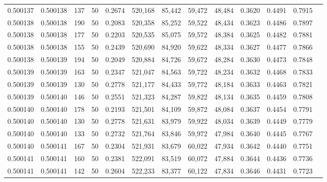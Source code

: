\begin{tabular}{rrrrrrrrrrrrr}
0.500137 & 0.500138 &   137 &  50 &                                     0.2674 & 520,168 &  85,442 &  59,472 &  48,484 & 0.3620 & 0.4491 & 0.7915 \\
0.500138 & 0.500138 &   190 &  50 &                                     0.2083 & 520,358 &  85,252 &  59,522 &  48,434 & 0.3623 & 0.4486 & 0.7897 \\
0.500138 & 0.500138 &   177 &  50 &                                     0.2203 & 520,535 &  85,075 &  59,572 &  48,384 & 0.3625 & 0.4482 & 0.7881 \\
0.500138 & 0.500138 &   155 &  50 &                                     0.2439 & 520,690 &  84,920 &  59,622 &  48,334 & 0.3627 & 0.4477 & 0.7866 \\
0.500138 & 0.500139 &   194 &  50 &                                     0.2049 & 520,884 &  84,726 &  59,672 &  48,284 & 0.3630 & 0.4473 & 0.7848 \\
0.500139 & 0.500139 &   163 &  50 &                                     0.2347 & 521,047 &  84,563 &  59,722 &  48,234 & 0.3632 & 0.4468 & 0.7833 \\
0.500139 & 0.500139 &   130 &  50 &                                     0.2778 & 521,177 &  84,433 &  59,772 &  48,184 & 0.3633 & 0.4463 & 0.7821 \\
0.500139 & 0.500140 &   146 &  50 &                                     0.2551 & 521,323 &  84,287 &  59,822 &  48,134 & 0.3635 & 0.4459 & 0.7808 \\
0.500140 & 0.500140 &   178 &  50 &                                     0.2193 & 521,501 &  84,109 &  59,872 &  48,084 & 0.3637 & 0.4454 & 0.7791 \\
0.500140 & 0.500140 &   130 &  50 &                                     0.2778 & 521,631 &  83,979 &  59,922 &  48,034 & 0.3639 & 0.4449 & 0.7779 \\
0.500140 & 0.500140 &   133 &  50 &                                     0.2732 & 521,764 &  83,846 &  59,972 &  47,984 & 0.3640 & 0.4445 & 0.7767 \\
0.500140 & 0.500141 &   167 &  50 &                                     0.2304 & 521,931 &  83,679 &  60,022 &  47,934 & 0.3642 & 0.4440 & 0.7751 \\
0.500141 & 0.500141 &   160 &  50 &                                     0.2381 & 522,091 &  83,519 &  60,072 &  47,884 & 0.3644 & 0.4436 & 0.7736 \\
0.500141 & 0.500141 &   142 &  50 &                                     0.2604 & 522,233 &  83,377 &  60,122 &  47,834 & 0.3646 & 0.4431 & 0.7723 \\

\end{tabular}
